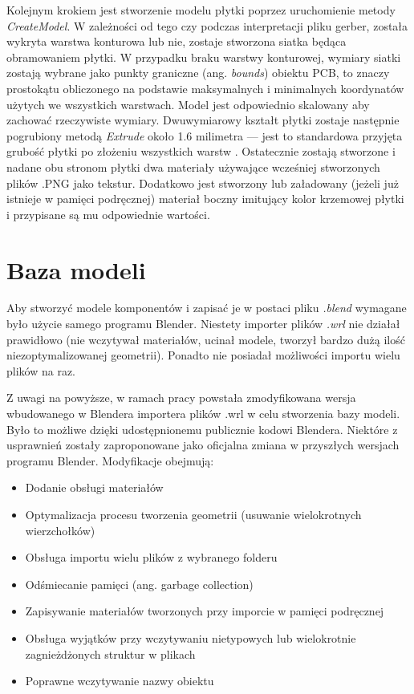 \documentclass[brudnopis]{xmgr}
\begin{document}
Kolejnym krokiem jest stworzenie modelu płytki poprzez uruchomienie metody \emph{CreateModel}. W zależności od tego czy podczas interpretacji pliku gerber, została wykryta warstwa konturowa lub nie, zostaje stworzona siatka będąca obramowaniem płytki. W przypadku braku warstwy konturowej, wymiary siatki zostają wybrane jako punkty graniczne (ang. \emph{bounds}) obiektu PCB, to znaczy prostokątu obliczonego na podstawie maksymalnych i minimalnych koordynatów użytych we wszystkich warstwach. Model jest odpowiednio skalowany aby zachować rzeczywiste wymiary.
Dwuwymiarowy kształt płytki zostaje następnie pogrubiony metodą \emph{Extrude} około 1.6 milimetra --- jest to standardowa przyjęta grubość płytki po złożeniu wszystkich warstw \cite{Khandpur}.
Ostatecznie zostają stworzone i nadane obu stronom płytki dwa materiały używające wcześniej stworzonych plików .PNG jako tekstur. Dodatkowo jest stworzony lub załadowany (jeżeli już istnieje w pamięci podręcznej) materiał boczny imitujący kolor krzemowej płytki i przypisane są mu odpowiednie wartości.

\section {Baza modeli\label{wrl}}

Aby stworzyć modele komponentów i zapisać je w postaci pliku \emph{.blend} wymagane było użycie samego programu Blender. Niestety importer plików \emph{.wrl} nie działał prawidłowo (nie wczytywał materiałów, ucinał modele, tworzył bardzo dużą ilość niezoptymalizowanej geometrii). Ponadto nie posiadał możliwości importu wielu plików na raz.

Z uwagi na powyższe, w ramach pracy powstała zmodyfikowana wersja wbudowanego w Blendera importera plików .wrl w celu stworzenia bazy modeli. Było to możliwe dzięki udostępnionemu publicznie kodowi Blendera. Niektóre z usprawnień zostały zaproponowane jako oficjalna zmiana w przyszłych wersjach programu Blender. Modyfikacje obejmują:
\begin{itemize}
\item Dodanie obsługi materiałów
\item Optymalizacja procesu tworzenia geometrii (usuwanie wielokrotnych wierzchołków)
\item Obsługa importu wielu plików z wybranego folderu
\item Odśmiecanie pamięci (ang. garbage collection)
\item Zapisywanie materiałów tworzonych przy imporcie w pamięci podręcznej
\item Obsługa wyjątków przy wczytywaniu nietypowych lub wielokrotnie zagnieżdżonych struktur w plikach
\item Poprawne wczytywanie nazwy obiektu
\end{itemize}
\end{document}
